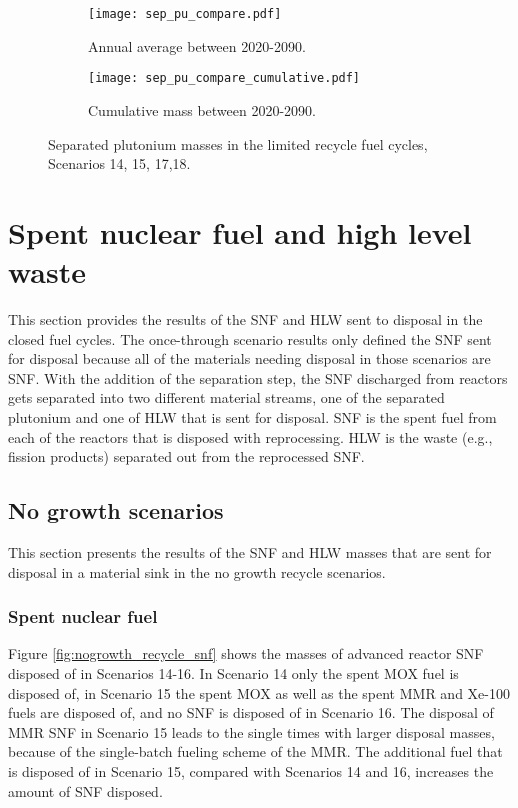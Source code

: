 \begin{figure}[h!]
    \centering
    \begin{subfigure}[b]{0.49\textwidth}
        \centering
        \texttt{[image: sep\_pu\_compare.pdf]}
        \caption{Annual average between 2020-2090.}
        \label{fig:_recycle_sep_pu_all}
    \end{subfigure}
    \hfill
    \begin{subfigure}[b]{0.49\textwidth}
        \centering
        \texttt{[image: sep\_pu\_compare\_cumulative.pdf]}
        \caption{Cumulative mass between 2020-2090.}
        \label{fig:recycle_sep_pu_cumulative}
    \end{subfigure}
       \caption{Separated plutonium masses in the limited 
       recycle fuel cycles, Scenarios 14, 15, 17,18.}
       \label{fig:recycle_sep_pu}
\end{figure}

\section{Spent nuclear fuel and high level waste}
This section provides the results of the \gls{SNF} and \gls{HLW} sent 
to disposal in the closed fuel cycles. The once-through scenario 
results only defined the \gls{SNF} sent for disposal because all 
of the materials needing disposal in those scenarios are \gls{SNF}. 
With the addition of the separation step, the \gls{SNF} discharged 
from reactors gets separated into two different material streams, 
one of the separated plutonium and one of \gls{HLW} that is sent 
for disposal. \gls{SNF} 
is the spent fuel from each of the reactors that is disposed 
with reprocessing. \gls{HLW} is 
the waste (e.g., fission products) separated out from the 
reprocessed \gls{SNF}. 

\subsection{No growth scenarios}
This section presents the results of the \gls{SNF} and 
\gls{HLW} masses that are sent for disposal in a 
material sink in the no growth recycle scenarios. 

\subsubsection{Spent nuclear fuel}
Figure \ref{fig:nogrowth_recycle_snf} shows the 
masses of advanced reactor \gls{SNF} disposed of 
in Scenarios 14-16. In Scenario 14 only the spent \gls{MOX} 
fuel is disposed of, in Scenario 15 the spent \gls{MOX} as 
well as the spent \gls{MMR} and Xe-100 fuels are disposed of, 
and no \gls{SNF} is disposed of in Scenario 16. The disposal of 
\gls{MMR} \gls{SNF} in Scenario 15 leads to the single times 
with larger disposal masses, because of the single-batch 
fueling scheme of the \gls{MMR}. The additional fuel that 
is disposed of in Scenario 15, compared with Scenarios 
14 and 16, increases the amount of \gls{SNF} disposed. 

